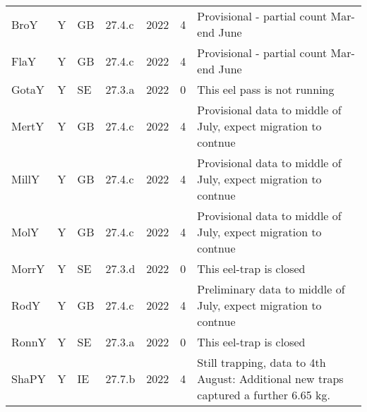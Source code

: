 \begin{table}[htbp]
\begin{tabular}{p{1.5cm}p{1.5cm}p{1.5cm}p{1cm}p{1cm}p{1cm}p{8cm}}
  BroY & Y & GB & 27.4.c & 2022 &   4 & Provisional - partial count Mar- end June \\ 
  FlaY & Y & GB & 27.4.c & 2022 &   4 & Provisional - partial count Mar- end June \\ 
  GotaY & Y & SE & 27.3.a & 2022 &   0 & This eel pass is not running \\ 
  MertY & Y & GB & 27.4.c & 2022 &   4 & Provisional data to middle of July, expect migration to contnue \\ 
  MillY & Y & GB & 27.4.c & 2022 &   4 & Provisional data to middle of July, expect migration to contnue \\ 
  MolY & Y & GB & 27.4.c & 2022 &   4 & Provisional data to middle of July, expect migration to contnue \\ 
  MorrY & Y & SE & 27.3.d & 2022 &   0 & This eel-trap is closed \\ 
  RodY & Y & GB & 27.4.c & 2022 &   4 & Preliminary data to middle of July, expect migration to contnue \\ 
  RonnY & Y & SE & 27.3.a & 2022 &   0 & This eel-trap is closed \\ 
  ShaPY & Y & IE & 27.7.b & 2022 &   4 & Still trapping, data to 4th August: Additional new traps captured a further 6.65 kg. \\ 
   \hline
\end{tabular}
\end{table}
